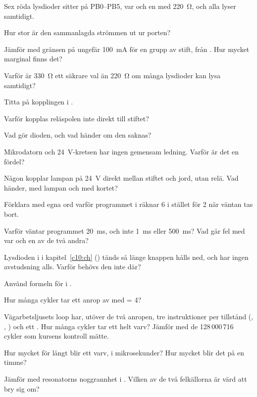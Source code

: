 \label{c11:ex:3}
Sex röda lysdioder sitter på PB0--PB5, var och en med 220~Ω, och alla lyser samtidigt.
\begin{parts}
  \item Hur stor är den sammanlagda strömmen ut ur porten?
  \item Jämför med gränsen på ungefär 100~mA för en grupp av stift, från . Hur mycket
    marginal finns det?
  \item Varför är 330~Ω ett säkrare val än 220~Ω om många lysdioder kan lysa samtidigt?
\end{parts}

\label{c11:ex:4}
Titta på kopplingen i .
\begin{parts}
  \item Varför kopplas reläspolen inte direkt till stiftet?
  \item Vad gör dioden, och vad händer om den saknas?
  \item Mikrodatorn och 24~V-kretsen har ingen gemensam ledning. Varför är det en fördel?
  \item Någon kopplar lampan på 24~V direkt mellan stiftet och jord, utan relä. Vad händer, med
    lampan och med kortet?
\end{parts}

\label{c11:ex:5}
\begin{parts}
  \item Förklara med egna ord varför programmet i  räknar 6 i stället för 2 när
    väntan tas bort.
  \item Varför väntar programmet 20~ms, och inte 1~ms eller 500~ms? Vad går fel med var och en av
    de två andra?
  \item Lysdioden i  i kapitel~\ref{c10:ch} () tänds så
    länge knappen hålls ned, och har ingen avstudsning alls. Varför behövs den inte där?
\end{parts}

\label{c11:ex:6}
Använd formeln för  i .
\begin{parts}
  \item Hur många cykler tar ett anrop av  med  = 4?
  \item Vägarbetsljusets loop har, utöver de två anropen, tre instruktioner per tillstånd
    (, , ) och ett . Hur många cykler tar ett helt varv?
    Jämför med de 128\,000\,716 cykler som kursens kontroll mätte.
  \item Hur mycket för långt blir ett varv, i mikrosekunder? Hur mycket blir det på en timme?
  \item Jämför med resonatorns noggrannhet i . Vilken av de två felkällorna är värd
    att bry sig om?
\end{parts}

